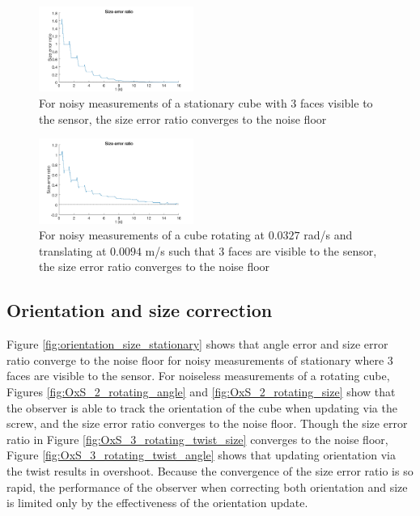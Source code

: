 \begin{figure}[h]
	\centering
  	\includegraphics[width=0.45\textwidth,trim = 0mm 0mm 0mm 0mm,clip]{./Figures/size_error_ratio_1}\vspace*{0ex}
	\caption{For noisy measurements of a stationary cube with 3 faces visible to the sensor, the size error ratio converges to the noise floor}
  	\label{fig:size_stationary}
\end{figure}

\begin{figure}[h]
	\centering
  	\includegraphics[width=0.45\textwidth,trim = 0mm 0mm 0mm 0mm,clip]{./Figures/size_error_ratio_2_RT_noise}\vspace*{0ex}
	\caption{For noisy measurements of a cube rotating at $0.0327$ rad/s and translating at $0.0094$ m/s such that 3 faces are visible to the sensor, the size error ratio converges to the noise floor}
  	\label{fig:size_RT_noise}
\end{figure}

\subsection{Orientation and size correction}      
Figure \ref{fig:orientation_size_stationary} shows that angle error and size error ratio converge to the noise floor for noisy measurements of stationary where 3 faces are visible to the sensor.
For noiseless measurements of a rotating cube, Figures \ref{fig:OxS_2_rotating_angle} and \ref{fig:OxS_2_rotating_size} show that the observer is able to track the orientation of the cube when updating via the screw, and the size error ratio converges to the noise floor.
Though the size error ratio in Figure \ref{fig:OxS_3_rotating_twist_size} converges to the noise floor, Figure \ref{fig:OxS_3_rotating_twist_angle} shows that updating orientation via the twist results in overshoot.
Because the convergence of the size error ratio is so rapid, the performance of the observer when correcting both orientation and size is limited only by the effectiveness of the orientation update.

